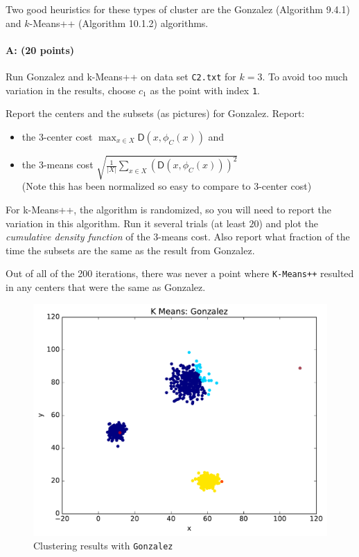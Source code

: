\documentclass[11pt]{article}
\newcommand{\D}{\textsf{D}}
\begin{document}
Two good heuristics for these types of cluster are the 
\textsf{Gonzalez} (Algorithm 9.4.1) and \textsf{$k$-Means++} (Algorithm 10.1.2) algorithms.  

\paragraph{A: (20 points)}
Run \textsf{Gonzalez} and \textsf{k-Means++} on data set \texttt{C2.txt} for $k=3$. 
To avoid too much variation in the results, choose $c_1$ as the point with index \texttt{1}.  

Report the centers and the subsets (as pictures) for \textsf{Gonzalez}.  Report:
\begin{itemize} \denselist
\item the $3$-center cost $\max_{x \in X} \D(x,\phi_C(x))$  and 
\item the $3$-means cost $\sqrt{\frac{1}{|X|}\sum_{x \in X} (\D(x,\phi_C(x)))^2}$
  \\ (Note this has been normalized so easy to compare to $3$-center cost)
\end{itemize}


For \textsf{k-Means++}, the algorithm is randomized, so you will need to report the variation in this algorithm.  Run it several trials (at least $20$) and plot the \emph{cumulative density function} of the $3$-means cost.  
Also report what fraction of the time the subsets are the same as the result from \textsf{Gonzalez}.  

Out of all of the 200 iterations, there was never a point where {\tt K-Means++} resulted in any centers that were the same as \textsf{Gonzalez}.

\begin{figure}[H]
\centering
\includegraphics[width=.75\textwidth]{gonzalez.pdf}
\caption{Clustering results with {\tt Gonzalez}}
\end{figure}
\end{document}
